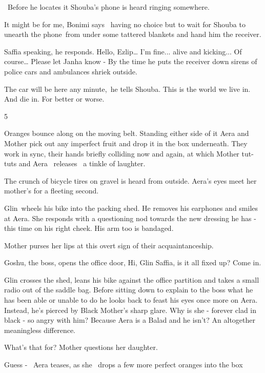\documentclass[letterpaper]{article}
\begin{document}
\ Before he locates it Shouba's phone is heard ringing somewhere. 

{\textquotedbl}It might be for me,{\textquotedbl} Bonimi says \ having no choice but to wait for Shouba to unearth the
phone~from under some tattered\textcolor{red}{ }blankets and hand him the receiver. 

{\textquotedbl}Saffia speaking,{\textquotedbl} he responds. {\textquotedbl}Hello, Ezlip{\dots} I'm fine... alive and
kicking... Of course{\dots} Please let Janha know -{\textquotedbl} By the time he puts the receiver down sirens of
police cars and ambulances shriek outside. 

{\textquotedbl}The car will be here any minute,{\textquotedbl}~he tells Shouba. {\textquotedbl}This is the world we live
in. And die in. For better or worse.{\textquotedbl}


\bigskip

5 

Oranges bounce along on the moving belt. Standing either side of it Aera and Mother pick out any imperfect fruit and
drop it in the box underneath. They work in sync, their hands briefly colliding now and again, at which Mother tut-tuts
and Aera \ releases \ a tinkle of laughter. 

The crunch of bicycle tires on gravel is heard from outside. Aera's eyes meet her mother's for a fleeting second. 

Glin~wheels his bike into the packing shed. He removes his earphones and smiles at Aera. She responds with a questioning
nod towards the new dressing he has - this time on his right cheek. His arm too is bandaged. 

Mother purses her lips at this overt sign of their acquaintanceship.~~~~~~~ 

Goshu, the boss, opens the office door, {\textquotedbl}Hi, Glin Saffia, is it all fixed up? Come in.{\textquotedbl}

Glin crosses the shed, leans his bike against the office partition and takes a small radio out of the saddle bag. Before
sitting down to explain to the boss what he has been able or unable to do he looks back to feast his eyes once more on
Aera. Instead, he's pierced by Black Mother's sharp glare. Why is she - forever clad in black - so angry with him?
Because Aera is a Balad and he isn't? An altogether meaningless difference.

{\textquotedbl}What's that for?{\textquotedbl} Mother questions her daughter.

{\textquotedbl}Guess -{\textquotedbl}~ Aera teases, as she \ drops a few more perfect oranges into the box
\end{document}
